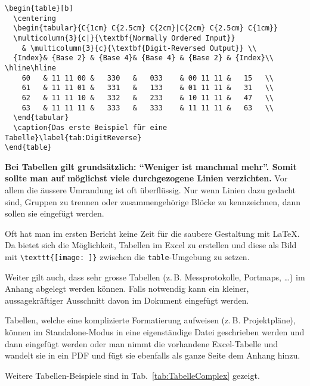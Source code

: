 \begin{verbatim}
\begin{table}[b]
  \centering
  \begin{tabular}{C{1cm} C{2.5cm} C{2cm}|C{2cm} C{2.5cm} C{1cm}} 
  \multicolumn{3}{c|}{\textbf{Normally Ordered Input}}
    & \multicolumn{3}{c}{\textbf{Digit-Reversed Output}} \\
  {Index}& {Base 2} & {Base 4}& {Base 4} & {Base 2} & {Index}\\ \hline\hline 
    60   & 11 11 00 &   330   &   033    & 00 11 11 &   15   \\
    61   & 11 11 01 &   331   &   133    & 01 11 11 &   31   \\
    62   & 11 11 10 &   332   &   233    & 10 11 11 &   47   \\
    63   & 11 11 11 &   333   &   333    & 11 11 11 &   63   \\
  \end{tabular}
  \caption{Das erste Beispiel für eine Tabelle}\label{tab:DigitReverse}
\end{table}
\end{verbatim}

\textbf{Bei Tabellen gilt grundsätzlich: \enquote{Weniger ist manchmal mehr}. Somit sollte man auf möglichst viele durchgezogene Linien verzichten.} Vor allem die äussere Umrandung ist oft überflüssig. Nur wenn Linien dazu gedacht sind, Gruppen zu trennen oder zusammengehörige Blöcke zu kennzeichnen, dann sollen sie eingefügt werden.

Oft hat man im ersten Bericht keine Zeit für die saubere Gestaltung mit \LaTeX. Da bietet sich die Möglichkeit, Tabellen im Excel zu erstellen und diese als Bild mit \verb|\texttt{[image: ]}| zwischen die \texttt{table}-Umgebung zu setzen.

Weiter gilt auch, dass sehr grosse Tabellen (z.\,B. Messprotokolle, Portmaps, \dots) im Anhang abgelegt werden können. Falls notwendig kann ein kleiner, aussagekräftiger Ausschnitt davon im Dokument eingefügt werden.

Tabellen, welche eine komplizierte Formatierung aufweisen (z.\,B. Projektpläne), können im Standalone-Modus in eine eigenständige Datei geschrieben werden und dann eingefügt werden oder man nimmt die vorhandene Excel-Tabelle und wandelt sie in ein PDF und fügt sie ebenfalls als ganze Seite dem Anhang hinzu.

Weitere Tabellen-Beispiele sind in Tab.~\ref{tab:TabelleComplex} gezeigt.

